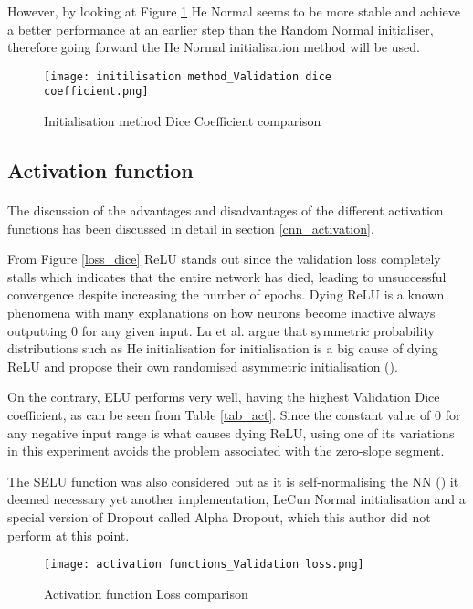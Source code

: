 However, by looking at Figure \ref{init_dice} He Normal seems to be more stable and achieve a better performance at an earlier step than the Random Normal initialiser, therefore going forward the He Normal initialisation method will be used.

\begin{figure}[hbt!]
    \centering
    \texttt{[image: initilisation method\_Validation dice coefficient.png]}
    \caption{Initialisation method Dice Coefficient comparison}
    \label{init_dice}
\end{figure}    


\subsection{Activation function}
\paragraph{}
The discussion of the advantages and disadvantages of the different activation functions has been discussed in detail in section \ref{cnn_activation}.

From Figure \ref{loss_dice} \gls{ReLU} stands out since the validation loss completely stalls which indicates that the entire network has died, leading to unsuccessful convergence despite increasing the number of epochs. Dying \gls{ReLU} is a known phenomena with many explanations on how neurons become inactive always outputting $0$ for any given input. Lu et al. argue that symmetric probability distributions such as He initialisation for initialisation is a big cause of dying \gls{ReLU} and propose their own randomised asymmetric initialisation (\cite{Lu_2020}).

On the contrary, \gls{ELU} performs very well, having the highest Validation Dice coefficient, as can be seen from Table \ref{tab_act}. Since the constant value of $0$ for any negative input range is what causes dying \gls{ReLU}, using one of its variations in this experiment avoids the problem associated with the zero-slope segment.

The \gls{SELU} function was also considered but as it is self-normalising the \gls{NN} (\cite{klambauer2017selfnormalizing}) it deemed necessary yet another implementation, LeCun Normal initialisation and a special version of Dropout called Alpha Dropout, which this author did not perform at this point.

\begin{figure}[hbt!]
    \centering
    \texttt{[image: activation functions\_Validation loss.png]}
    \caption{Activation function Loss comparison}
    \label{act_dice}
\end{figure}

